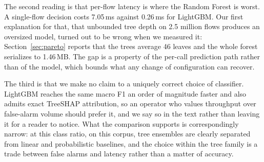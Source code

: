 \documentclass{ieeeaccess}
\begin{document}
The second reading is that per-flow latency is where the Random Forest is worst.
A single-flow decision costs 7.05\,ms against 0.26\,ms for LightGBM. Our first
explanation for that, that unbounded tree depth on 2.5 million flows produces an
oversized model, turned out to be wrong when we measured it:
Section~\ref{sec:pareto} reports that the trees average 46 leaves and the whole
forest serializes to 1.46\,MB. The gap is a property of the per-call prediction
path rather than of the model, which bounds what any change of configuration can
recover.

The third is that we make no claim to a uniquely correct choice of classifier.
LightGBM reaches the same macro F1 an order of magnitude faster and also admits
exact TreeSHAP attribution, so an operator who values throughput over false-alarm
volume should prefer it, and we say so in the text rather than leaving it for a reader to notice. What
the comparison supports is correspondingly narrow: at this class ratio, on
this corpus, tree ensembles are clearly separated from linear and
probabilistic baselines, and the choice within the tree family is a trade
between false alarms and latency rather than a matter of accuracy.
\end{document}
